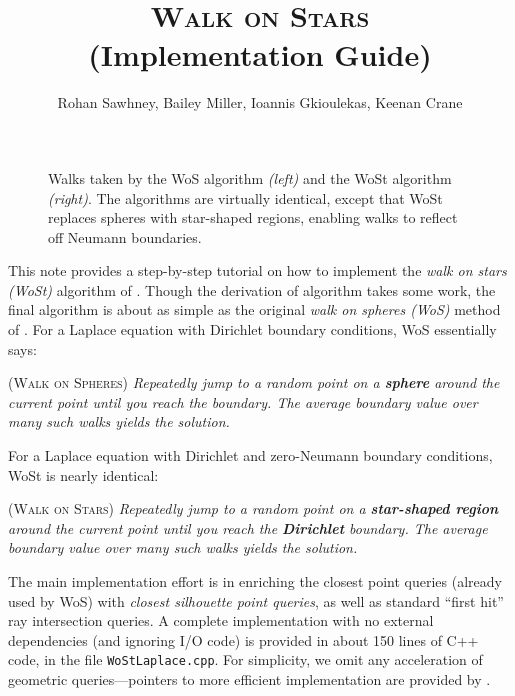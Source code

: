 \documentclass{article}
\title{\textsc{Walk on Stars} \\ \Large{(Implementation Guide)}}
\author{Rohan Sawhney, Bailey Miller, Ioannis Gkioulekas, Keenan Crane}
\date{}
\newcommand{\code}[1]{\texttt{\small{#1}}}
\newcommand{\todo}[1]{\textbf{\hl{TODO: #1}}}
\begin{document}
\maketitle

\begin{figure}[h!]
   \centering
   
   
   \caption{Walks taken by the WoS algorithm \emph{(left)} and the WoSt algorithm \emph{(right)}.  The algorithms are virtually identical, except that WoSt replaces spheres with star-shaped regions, enabling walks to reflect off Neumann boundaries.\label{fig:WalkOnStars}}
\end{figure}


This note provides a step-by-step tutorial on how to implement the \emph{walk on stars (WoSt)} algorithm of \citet{Sawhney:2023:WoSt}.  Though the derivation of algorithm takes some work, the final algorithm is about as simple as the original \emph{walk on spheres (WoS)} method of \citet{muller1956some}.  For a Laplace equation with Dirichlet boundary conditions, WoS essentially says:

\begin{mdframed}[backgroundcolor=black!10,rightline=false,leftline=false]
   \textsc{(Walk on Spheres)} \emph{Repeatedly jump to a random point on a \textbf{sphere} around the current point until you reach the boundary.  The average boundary value over many such walks yields the solution.}
\end{mdframed}

For a Laplace equation with Dirichlet and zero-Neumann boundary conditions, WoSt is nearly identical:

\begin{mdframed}[backgroundcolor=black!10,rightline=false,leftline=false]
   \textsc{(Walk on Stars)} \emph{Repeatedly jump to a random point on a \textbf{star-shaped region} around the current point until you reach the \textbf{Dirichlet} boundary.  The average boundary value over many such walks yields the solution.}
\end{mdframed}

The main implementation effort is in enriching the closest point queries (already used by WoS) with \emph{closest silhouette point queries}, as well as standard ``first hit'' ray intersection queries.  A complete implementation with no external dependencies (and ignoring I/O code) is provided in about 150 lines of C++ code, in the file \code{WoStLaplace.cpp}.  For simplicity, we omit any acceleration of geometric queries---pointers to more efficient implementation are provided by \citet{Sawhney:2023:WoSt}.
\end{document}
